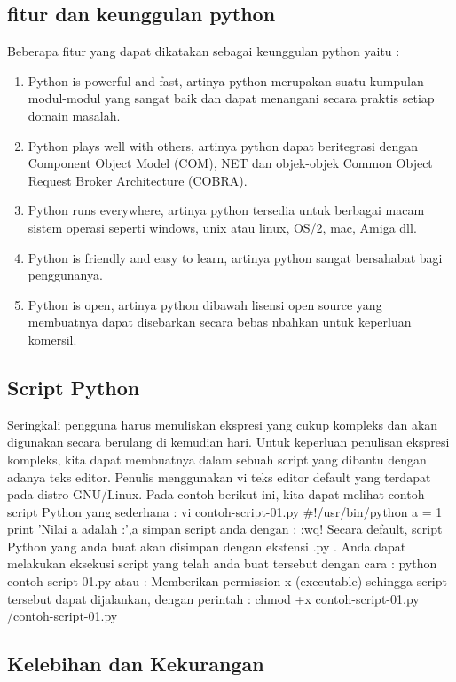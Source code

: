 \subsection{fitur dan keunggulan python}
Beberapa fitur yang dapat dikatakan sebagai keunggulan python yaitu :
\begin{enumerate}
\item Python is powerful and fast, artinya python merupakan suatu kumpulan modul-modul yang sangat baik  dan dapat menangani secara praktis setiap domain masalah.
\item Python plays well with others, artinya python dapat beritegrasi dengan Component Object Model (COM), NET dan objek-objek Common Object Request Broker Architecture (COBRA).
\item Python runs everywhere, artinya python tersedia untuk berbagai macam sistem operasi seperti windows, unix atau linux, OS/2, mac, Amiga dll.
\item Python is friendly and easy to learn, artinya python sangat bersahabat bagi penggunanya.
\item Python is open, artinya python dibawah lisensi open source yang membuatnya dapat disebarkan secara bebas nbahkan untuk keperluan komersil.
\end{enumerate}

\subsection{Script Python}
    Seringkali pengguna harus menuliskan ekspresi yang cukup kompleks dan akan digunakan secara berulang di kemudian hari. Untuk keperluan penulisan ekspresi kompleks, kita dapat membuatnya dalam sebuah script yang dibantu dengan adanya teks editor. Penulis menggunakan vi teks editor default yang terdapat pada distro GNU/Linux. Pada contoh berikut ini, kita dapat melihat contoh script Python yang sederhana : 
vi contoh-script-01.py
#!/usr/bin/python
a = 1
print 'Nilai a adalah :',a
simpan script anda dengan :
:wq!
  Secara default, script Python yang anda buat akan disimpan dengan ekstensi .py . Anda dapat melakukan eksekusi script yang telah anda buat tersebut dengan cara :
    	python contoh-script-01.py
    atau :
    Memberikan permission x (executable) sehingga
   script tersebut dapat dijalankan, dengan perintah :
    chmod +x contoh-script-01.py
    /contoh-script-01.py

\subsection{Kelebihan dan Kekurangan}
